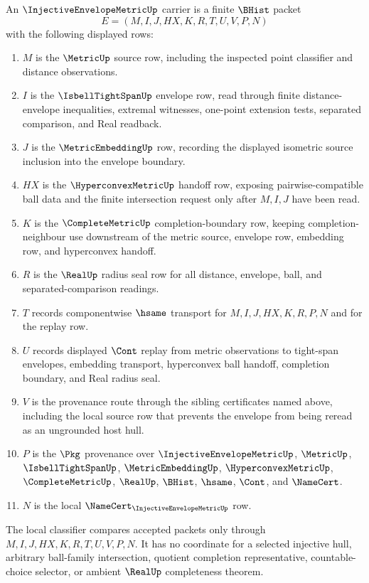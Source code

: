 \begin{definition}
\label{def:injective-envelope-metric-carrier}
An $\InjectiveEnvelopeMetricUp$ carrier is a finite $\BHist$ packet
$$
E=(M,I,J,HX,K,R,T,U,V,P,N)
$$
with the following displayed rows:
\begin{enumerate}
\item $M$ is the $\MetricUp$ source row, including the inspected point classifier and distance observations.
\item $I$ is the $\IsbellTightSpanUp$ envelope row, read through finite distance-envelope inequalities, extremal witnesses, one-point extension tests, separated comparison, and Real readback.
\item $J$ is the $\MetricEmbeddingUp$ row, recording the displayed isometric source inclusion into the envelope boundary.
\item $HX$ is the $\HyperconvexMetricUp$ handoff row, exposing pairwise-compatible ball data and the finite intersection request only after $M,I,J$ have been read.
\item $K$ is the $\CompleteMetricUp$ completion-boundary row, keeping completion-neighbour use downstream of the metric source, envelope row, embedding row, and hyperconvex handoff.
\item $R$ is the $\RealUp$ radius seal row for all distance, envelope, ball, and separated-comparison readings.
\item $T$ records componentwise $\hsame$ transport for $M,I,J,HX,K,R,P,N$ and for the replay row.
\item $U$ records displayed $\Cont$ replay from metric observations to tight-span envelopes, embedding transport, hyperconvex ball handoff, completion boundary, and Real radius seal.
\item $V$ is the provenance route through the sibling certificates named above, including the local source row that prevents the envelope from being reread as an ungrounded host hull.
\item $P$ is the $\Pkg$ provenance over $\InjectiveEnvelopeMetricUp$, $\MetricUp$, $\IsbellTightSpanUp$, $\MetricEmbeddingUp$, $\HyperconvexMetricUp$, $\CompleteMetricUp$, $\RealUp$, $\BHist$, $\hsame$, $\Cont$, and $\NameCert$.
\item $N$ is the local $\NameCert_{\InjectiveEnvelopeMetricUp}$ row.
\end{enumerate}
The local classifier compares accepted packets only through $M,I,J,HX,K,R,T,U,V,P,N$. It has no coordinate for a selected injective hull, arbitrary ball-family intersection, quotient completion representative, countable-choice selector, or ambient $\RealUp$ completeness theorem.
\end{definition}


